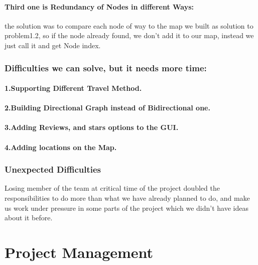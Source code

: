 \documentclass[a4paper,english]{book}
\begin{document}
\subsubsection{Third one is Redundancy of Nodes in different Ways:} the solution was to compare each node of way to the map we built as solution to problem1.2, so if the node already found, we don’t add it to our map, instead we just call it and get Node index.
\subsection{Difficulties we can solve, but it needs more time:}
\subsubsection{1.Supporting Different Travel Method.}
\subsubsection{2.Building Directional Graph instead of Bidirectional one.}
\subsubsection{3.Adding Reviews, and stars options to the GUI.}
\subsubsection{4.Adding locations on the Map.}
\subsection{Unexpected Difficulties}
Losing member of the team at critical time of the project doubled the responsibilities to do more than what we have already planned to do, and make us work under pressure in some parts of the project which we didn't have ideas about it before.
\chapter{Project Management}
\end{document}
